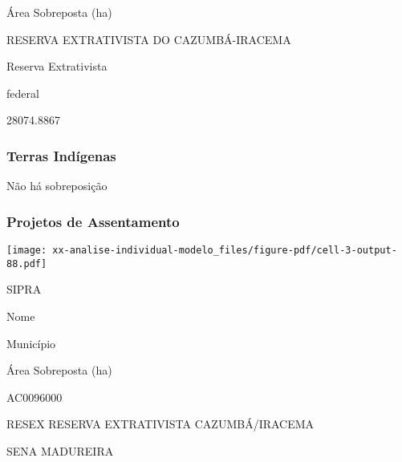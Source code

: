 \documentclass[
  11pt,
  a4paper,
  DIV=11,
  numbers=noendperiod]{scrartcl}
\begin{document}
Área Sobreposta (ha)

\n    

\n  

\n  

\n    

\n      

RESERVA EXTRATIVISTA DO CAZUMBÁ-IRACEMA

\n      

Reserva Extrativista

\n      

federal

\n      

28074.8867

\n    

\n  

\n

\subsubsection{Terras Indígenas}\label{terras-induxedgenas-4}

Não há sobreposição

\subsubsection{Projetos de
Assentamento}\label{projetos-de-assentamento-4}

\texttt{[image: xx-analise-individual-modelo\_files/figure-pdf/cell-3-output-88.pdf]}

\n  

\n    

\n      

SIPRA

\n      

Nome

\n      

Município

\n      

Área Sobreposta (ha)

\n    

\n  

\n  

\n    

\n      

AC0096000

\n      

RESEX RESERVA EXTRATIVISTA CAZUMBÁ/IRACEMA

\n      

SENA MADUREIRA

\n      
\end{document}
